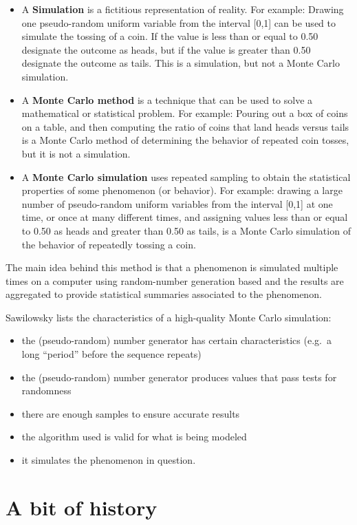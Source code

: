 \documentclass[
]{book}
\theoremstyle{definition}
\theoremstyle{definition}
\theoremstyle{definition}
\theoremstyle{definition}
\theoremstyle{remark}
\begin{document}
\begin{itemize}
\item
  A \textbf{Simulation} is a fictitious representation of reality. For example: Drawing one pseudo-random uniform variable from the interval {[}0,1{]} can be used to simulate the tossing of a coin. If the value is less than or equal to 0.50 designate the outcome as heads, but if the value is greater than 0.50 designate the outcome as tails. This is a simulation, but not a Monte Carlo simulation.
\item
  A \textbf{Monte Carlo method} is a technique that can be used to solve a mathematical or statistical problem. For example: Pouring out a box of coins on a table, and then computing the ratio of coins that land heads versus tails is a Monte Carlo method of determining the behavior of repeated coin tosses, but it is not a simulation.
\item
  A \textbf{Monte Carlo simulation} uses repeated sampling to obtain the statistical properties of some phenomenon (or behavior). For example: drawing a large number of pseudo-random uniform variables from the interval {[}0,1{]} at one time, or once at many different times, and assigning values less than or equal to 0.50 as heads and greater than 0.50 as tails, is a Monte Carlo simulation of the behavior of repeatedly tossing a coin.
\end{itemize}

The main idea behind this method is that a phenomenon is simulated multiple times on a computer using random-number generation based and the results are aggregated to provide statistical summaries associated to the phenomenon.

Sawilowsky lists the characteristics of a high-quality Monte Carlo simulation:

\begin{itemize}
\item
  the (pseudo-random) number generator has certain characteristics (e.g.~a long ``period'' before the sequence repeats)
\item
  the (pseudo-random) number generator produces values that pass tests for randomness
\item
  there are enough samples to ensure accurate results
\item
  the algorithm used is valid for what is being modeled
\item
  it simulates the phenomenon in question.
\end{itemize}

\hypertarget{a-bit-of-history}{%
\section{A bit of history}\label{a-bit-of-history}}
\end{document}
